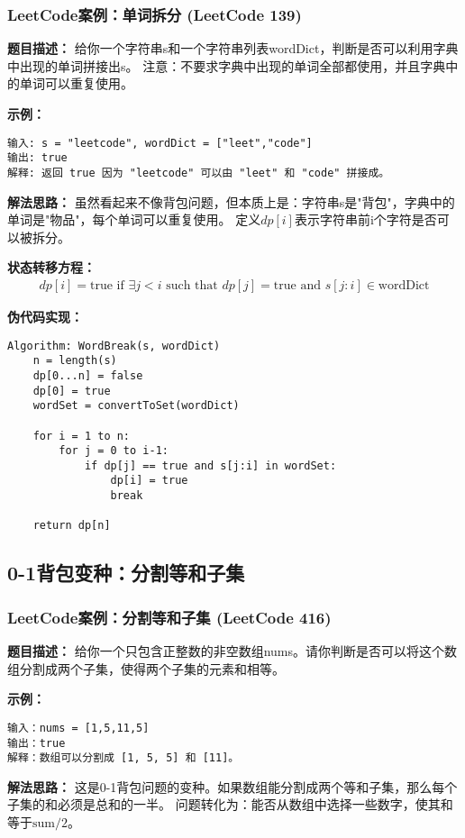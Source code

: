 \subsubsection{LeetCode案例：单词拆分 (LeetCode 139)}
\textbf{题目描述：}
给你一个字符串s和一个字符串列表wordDict，判断是否可以利用字典中出现的单词拼接出s。
注意：不要求字典中出现的单词全部都使用，并且字典中的单词可以重复使用。

\textbf{示例：}
\begin{verbatim}
输入: s = "leetcode", wordDict = ["leet","code"]
输出: true
解释: 返回 true 因为 "leetcode" 可以由 "leet" 和 "code" 拼接成。
\end{verbatim}

\textbf{解法思路：}
虽然看起来不像背包问题，但本质上是：字符串s是"背包"，字典中的单词是"物品"，每个单词可以重复使用。
定义$dp[i]$表示字符串前i个字符是否可以被拆分。

\textbf{状态转移方程：}
\begin{align}
dp[i] = \text{true if } \exists j < i \text{ such that } dp[j] = \text{true and } s[j:i] \in \text{wordDict}
\end{align}

\textbf{伪代码实现：}
\begin{verbatim}
Algorithm: WordBreak(s, wordDict)
    n = length(s)
    dp[0...n] = false
    dp[0] = true
    wordSet = convertToSet(wordDict)
    
    for i = 1 to n:
        for j = 0 to i-1:
            if dp[j] == true and s[j:i] in wordSet:
                dp[i] = true
                break
    
    return dp[n]
\end{verbatim}

\subsection{0-1背包变种：分割等和子集}
\subsubsection{LeetCode案例：分割等和子集 (LeetCode 416)}
\textbf{题目描述：}
给你一个只包含正整数的非空数组nums。请你判断是否可以将这个数组分割成两个子集，使得两个子集的元素和相等。

\textbf{示例：}
\begin{verbatim}
输入：nums = [1,5,11,5]
输出：true
解释：数组可以分割成 [1, 5, 5] 和 [11]。
\end{verbatim}

\textbf{解法思路：}
这是0-1背包问题的变种。如果数组能分割成两个等和子集，那么每个子集的和必须是总和的一半。
问题转化为：能否从数组中选择一些数字，使其和等于$\text{sum}/2$。

